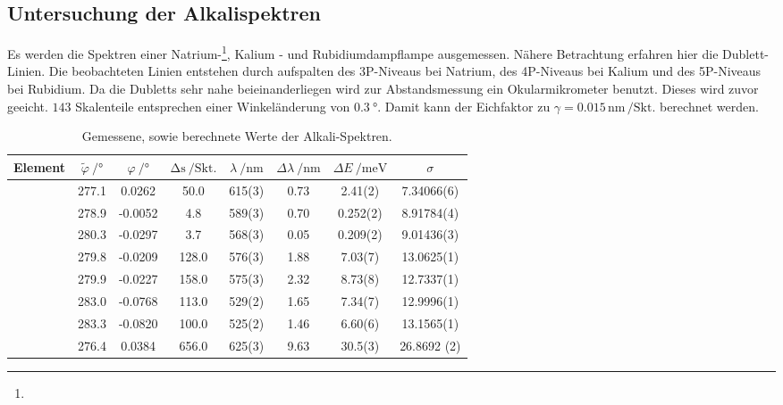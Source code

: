 \subsection{Untersuchung der Alkalispektren}
Es werden die Spektren einer Natrium-\footnote{\Bat}, Kalium - und Rubidiumdampflampe ausgemessen. Nähere Betrachtung erfahren hier die Dublett-Linien. Die beobachteten Linien entstehen durch aufspalten des 3P-Niveaus bei Natrium, des 4P-Niveaus bei Kalium und des 5P-Niveaus bei Rubidium.  Da die Dubletts sehr nahe beieinanderliegen wird zur Abstandsmessung ein Okularmikrometer benutzt. Dieses wird zuvor geeicht. $143$ Skalenteile entsprechen einer Winkeländerung von $\SI{0,3}{\degree}$. Damit kann der Eichfaktor zu $\gamma=0.015\,\si{\nano\meter}\,/\text{Skt.}$ berechnet werden. 
\begin{table}
\centering
\begin{tabular}{S  S[table-format=3.1] S[table-format=1.4] S[table-format=3.1] S[table-format=1.0(1)] S[table-format=1.0] S[table-format=1.3(1)] S[table-format=1.5(1)] }
\toprule
{Element} & {$\tilde{\varphi}\:/\si\degree$} & {$\varphi\:/\si\degree$} & {$\mathup{\Delta{s}}\:/\mathup{Skt.}$}& {$\lambda\:/\si{\nano\meter}$} & {$\Delta{\lambda}\:/\si{\nano\meter}$}&{$\Delta{E}\:/\si{\milli}\mathup{e}\si\volt$}&{$\sigma$}\\
\midrule
{}  & 277.1 &  0.0262 &  50.0 & 615(3) & 0.73 &  2.41(2)    &   7.34066(6)  \\
           & 278.9 & -0.0052 &   4.8 & 589(3) & 0.70 &  0.252(2)   &   8.91784(4)  \\
           & 280.3 & -0.0297 &   3.7 & 568(3) & 0.05 &  0.209(2)   &   9.01436(3)  \\
  & 279.8 & -0.0209 & 128.0 & 576(3) & 1.88 &  7.03(7)    &  13.0625(1)    \\
           & 279.9 & -0.0227 & 158.0 & 575(3) & 2.32 &  8.73(8)    &  12.7337(1)  \\
           & 283.0 & -0.0768 & 113.0 & 529(2) & 1.65 &  7.34(7)    &  12.9996(1)  \\
           & 283.3 & -0.0820 & 100.0 & 525(2) & 1.46 &  6.60(6)    &  13.1565(1)    \\
  & 276.4 &  0.0384 & 656.0 & 625(3) & 9.63 & 30.5(3)     &  26.8692 (2)   \\
\bottomrule
\end{tabular}
\caption{Gemessene, sowie berechnete Werte der Alkali-Spektren.}
\label{tab:spektren}
\end{table}
